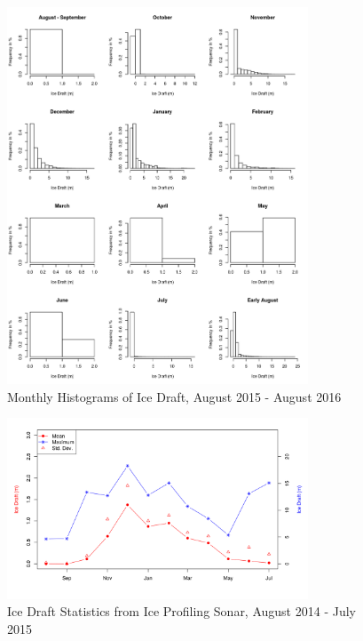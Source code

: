 \documentclass[12pt]{dforeport}
\begin{document}
\begin{figure}  
\centering
\includegraphics[width = 0.8\textwidth]{./figures/66_iceHist_2015_2016.png}
\caption[Histograms of ice draft, 2015-2016]{Monthly Histograms of Ice Draft, August 2015 - August 2016}
\label{f:ih_2015_2016}
\end{figure}



\begin{figure}  
\centering
\includegraphics[width = 0.8\textwidth]{./figures/67_iceDraftStat_2014_2015.png}
\caption[Ice draft Statistics, 2014-2015]{Ice Draft Statistics from Ice Profiling Sonar, August 2014 - July 2015}
\label{f:ids_2014_2015}
\end{figure}
\end{document}
